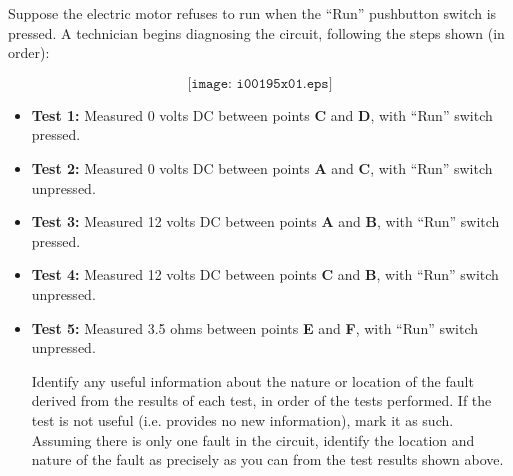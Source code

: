 

Suppose the electric motor refuses to run when the ``Run'' pushbutton switch is pressed.  A technician begins diagnosing the circuit, following the steps shown (in order):

$$\texttt{[image: i00195x01.eps]}$$

\begin{itemize}
\item{} {\bf Test 1:} Measured 0 volts DC between points {\bf C} and {\bf D}, with ``Run'' switch pressed.
\vskip 25pt
\item{} {\bf Test 2:} Measured 0 volts DC between points {\bf A} and {\bf C}, with ``Run'' switch unpressed.
\vskip 25pt
\item{} {\bf Test 3:} Measured 12 volts DC between points {\bf A} and {\bf B}, with ``Run'' switch pressed.
\vskip 25pt
\item{} {\bf Test 4:} Measured 12 volts DC between points {\bf C} and {\bf B}, with ``Run'' switch unpressed.
\vskip 25pt
\item{} {\bf Test 5:} Measured 3.5 ohms between points {\bf E} and {\bf F}, with ``Run'' switch unpressed.
\vskip 25pt
\medskip

Identify any useful information about the nature or location of the fault derived from the results of each test, in order of the tests performed.  If the test is not useful (i.e. provides no new information), mark it as such.  Assuming there is only one fault in the circuit, identify the location and nature of the fault as precisely as you can from the test results shown above.

\vfil 

\eject







\end{itemize}
